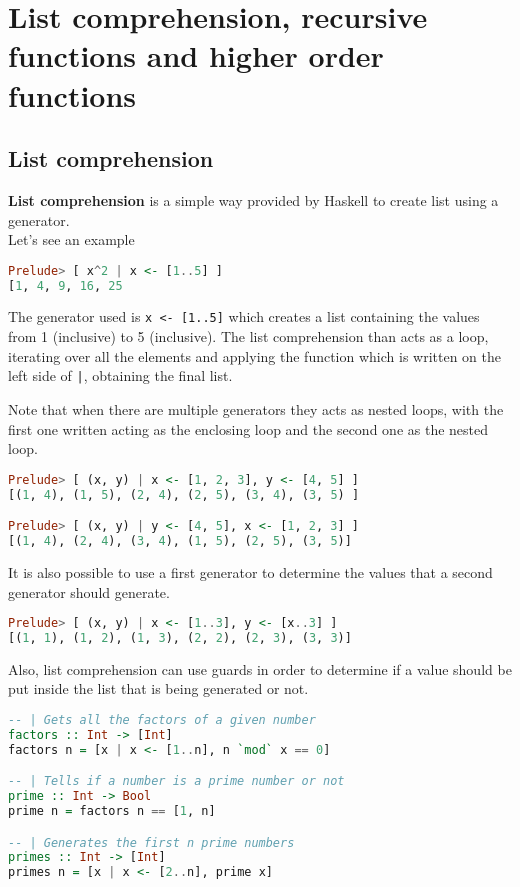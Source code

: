 \newpage
\chapter{List comprehension, recursive functions and higher order functions}

\section{List comprehension}
\textbf{List comprehension} is a simple way provided by Haskell to create list using a generator.\\
Let's see an example

\begin{lstlisting}[language=haskell]
Prelude> [ x^2 | x <- [1..5] ]
[1, 4, 9, 16, 25
\end{lstlisting}

The generator used is \texttt{x <- [1..5]} which creates a list containing the values from 1 (inclusive) to 5 (inclusive). The list comprehension than acts as a loop, iterating over all the elements and applying the function which is written on the left side of \texttt{|}, obtaining the final list.
\linebreak \linebreak

Note that when there are multiple generators they acts as nested loops, with the first one written acting as the enclosing loop and the second one as the nested loop.

\begin{lstlisting}[language=haskell]
Prelude> [ (x, y) | x <- [1, 2, 3], y <- [4, 5] ]
[(1, 4), (1, 5), (2, 4), (2, 5), (3, 4), (3, 5) ]

Prelude> [ (x, y) | y <- [4, 5], x <- [1, 2, 3] ]
[(1, 4), (2, 4), (3, 4), (1, 5), (2, 5), (3, 5)]
\end{lstlisting}

It is also possible to use a first generator to determine the values that a second generator should generate.

\begin{lstlisting}[language=haskell]
Prelude> [ (x, y) | x <- [1..3], y <- [x..3] ]
[(1, 1), (1, 2), (1, 3), (2, 2), (2, 3), (3, 3)]
\end{lstlisting}

Also, list comprehension can use guards in order to determine if a value should be put inside the list that is being generated or not.

\begin{lstlisting}[language=haskell]
-- | Gets all the factors of a given number
factors :: Int -> [Int]
factors n = [x | x <- [1..n], n `mod` x == 0]

-- | Tells if a number is a prime number or not 
prime :: Int -> Bool
prime n = factors n == [1, n]

-- | Generates the first n prime numbers
primes :: Int -> [Int]
primes n = [x | x <- [2..n], prime x]
\end{lstlisting}


